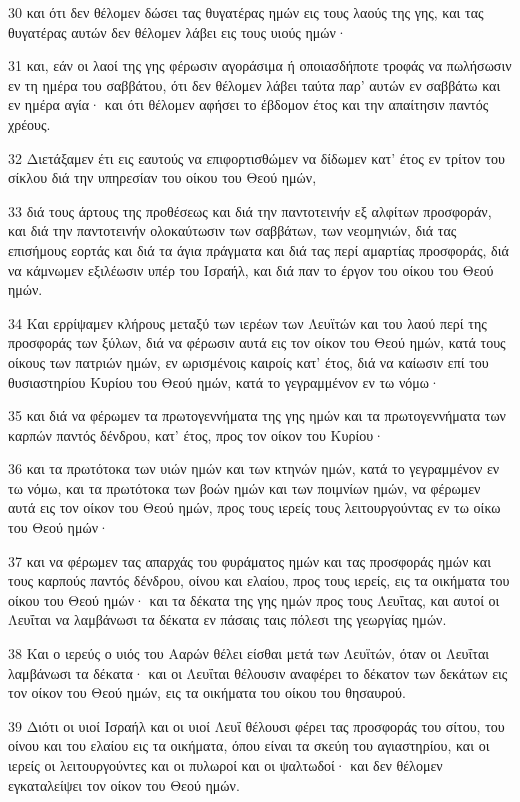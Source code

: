 \par 30 και ότι δεν θέλομεν δώσει τας θυγατέρας ημών εις τους λαούς της γης, και τας θυγατέρας αυτών δεν θέλομεν λάβει εις τους υιούς ημών·
\par 31 και, εάν οι λαοί της γης φέρωσιν αγοράσιμα ή οποιασδήποτε τροφάς να πωλήσωσιν εν τη ημέρα του σαββάτου, ότι δεν θέλομεν λάβει ταύτα παρ' αυτών εν σαββάτω και εν ημέρα αγία· και ότι θέλομεν αφήσει το έβδομον έτος και την απαίτησιν παντός χρέους.
\par 32 Διετάξαμεν έτι εις εαυτούς να επιφορτισθώμεν να δίδωμεν κατ' έτος εν τρίτον του σίκλου διά την υπηρεσίαν του οίκου του Θεού ημών,
\par 33 διά τους άρτους της προθέσεως και διά την παντοτεινήν εξ αλφίτων προσφοράν, και διά την παντοτεινήν ολοκαύτωσιν των σαββάτων, των νεομηνιών, διά τας επισήμους εορτάς και διά τα άγια πράγματα και διά τας περί αμαρτίας προσφοράς, διά να κάμνωμεν εξιλέωσιν υπέρ του Ισραήλ, και διά παν το έργον του οίκου του Θεού ημών.
\par 34 Και ερρίψαμεν κλήρους μεταξύ των ιερέων των Λευϊτών και του λαού περί της προσφοράς των ξύλων, διά να φέρωσιν αυτά εις τον οίκον του Θεού ημών, κατά τους οίκους των πατριών ημών, εν ωρισμένοις καιροίς κατ' έτος, διά να καίωσιν επί του θυσιαστηρίου Κυρίου του Θεού ημών, κατά το γεγραμμένον εν τω νόμω·
\par 35 και διά να φέρωμεν τα πρωτογεννήματα της γης ημών και τα πρωτογεννήματα των καρπών παντός δένδρου, κατ' έτος, προς τον οίκον του Κυρίου·
\par 36 και τα πρωτότοκα των υιών ημών και των κτηνών ημών, κατά το γεγραμμένον εν τω νόμω, και τα πρωτότοκα των βοών ημών και των ποιμνίων ημών, να φέρωμεν αυτά εις τον οίκον του Θεού ημών, προς τους ιερείς τους λειτουργούντας εν τω οίκω του Θεού ημών·
\par 37 και να φέρωμεν τας απαρχάς του φυράματος ημών και τας προσφοράς ημών και τους καρπούς παντός δένδρου, οίνου και ελαίου, προς τους ιερείς, εις τα οικήματα του οίκου του Θεού ημών· και τα δέκατα της γης ημών προς τους Λευΐτας, και αυτοί οι Λευΐται να λαμβάνωσι τα δέκατα εν πάσαις ταις πόλεσι της γεωργίας ημών.
\par 38 Και ο ιερεύς ο υιός του Ααρών θέλει είσθαι μετά των Λευϊτών, όταν οι Λευΐται λαμβάνωσι τα δέκατα· και οι Λευΐται θέλουσιν αναφέρει το δέκατον των δεκάτων εις τον οίκον του Θεού ημών, εις τα οικήματα του οίκου του θησαυρού.
\par 39 Διότι οι υιοί Ισραήλ και οι υιοί Λευΐ θέλουσι φέρει τας προσφοράς του σίτου, του οίνου και του ελαίου εις τα οικήματα, όπου είναι τα σκεύη του αγιαστηρίου, και οι ιερείς οι λειτουργούντες και οι πυλωροί και οι ψαλτωδοί· και δεν θέλομεν εγκαταλείψει τον οίκον του Θεού ημών.


